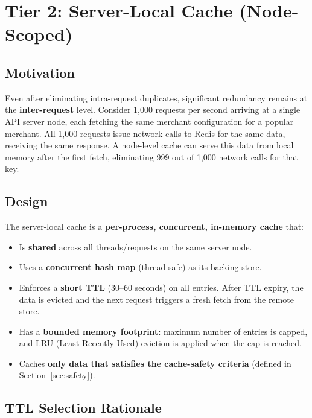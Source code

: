 \documentclass[12pt,a4paper]{report}
\begin{document}
\section{Tier 2: Server-Local Cache (Node-Scoped)}

\subsection{Motivation}

Even after eliminating intra-request duplicates, significant redundancy remains at the \textbf{inter-request} level. Consider 1,000 requests per second arriving at a single API server node, each fetching the same merchant configuration for a popular merchant. All 1,000 requests issue network calls to Redis for the same data, receiving the same response. A node-level cache can serve this data from local memory after the first fetch, eliminating 999 out of 1,000 network calls for that key.

\subsection{Design}

The server-local cache is a \textbf{per-process, concurrent, in-memory cache} that:

\begin{itemize}
    \item Is \textbf{shared} across all threads/requests on the same server node.
    \item Uses a \textbf{concurrent hash map} (thread-safe) as its backing store.
    \item Enforces a \textbf{short TTL} (30–60 seconds) on all entries. After TTL expiry, the data is evicted and the next request triggers a fresh fetch from the remote store.
    \item Has a \textbf{bounded memory footprint}: maximum number of entries is capped, and LRU (Least Recently Used) eviction is applied when the cap is reached.
    \item Caches \textbf{only data that satisfies the cache-safety criteria} (defined in Section~\ref{sec:safety}).
\end{itemize}

\subsection{TTL Selection Rationale}
\end{document}
